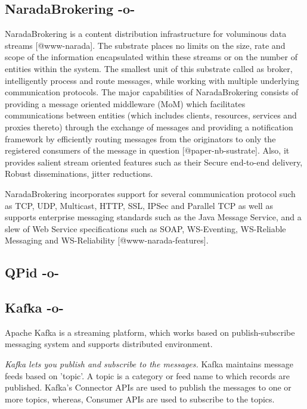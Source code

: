 \subsection{NaradaBrokering -o-}

NaradaBrokering is a content distribution infrastructure for
voluminous data streams [@www-narada].  The substrate places no
limits on the size, rate and scope of the information encapsulated
within these streams or on the number of entities within the
system. The smallest unit of this substrate called as broker,
intelligently process and route messages, while working with multiple
underlying communication protocols. The major capabilities of
NaradaBrokering consists of providing a message oriented middleware
(MoM) which facilitates communications between entities (which
includes clients, resources, services and proxies thereto) through the
exchange of messages and providing a notification framework by
efficiently routing messages from the originators to only the
registered consumers of the message in
question [@paper-nb-sustrate]. Also, it provides salient stream
oriented features such as their Secure end-to-end delivery, Robust
disseminations, jitter reductions.

NaradaBrokering incorporates support for several communication
protocol such as TCP, UDP, Multicast, HTTP, SSL, IPSec and Parallel
TCP as well as supports enterprise messaging standards such as the
Java Message Service, and a slew of Web Service specifications such as
SOAP, WS-Eventing, WS-Reliable Messaging and
WS-Reliability [@www-narada-features].



     
\subsection{QPid -o-}



\subsection{Kafka -o-}

Apache Kafka is a streaming platform, which works based on
publish-subscribe messaging system and supports distributed
environment.
      
\textit{Kafka lets you publish and subscribe to the messages.}  Kafka
maintains message feeds based on 'topic'. A topic is a category or
feed name to which records are published. Kafka's Connector APIs are
used to publish the messages to one or more topics, whereas, Consumer
APIs are used to subscribe to the topics.


